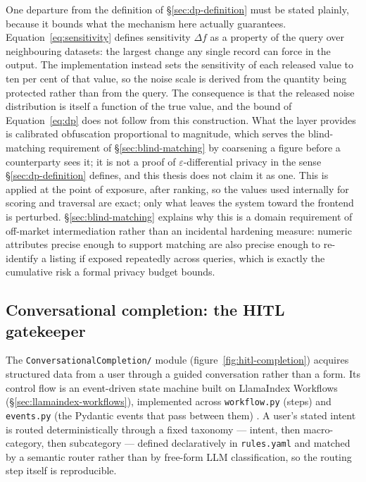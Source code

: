 One departure from the definition of \S\ref{sec:dp-definition} must be stated plainly, because it bounds what the mechanism here actually guarantees. Equation~\ref{eq:sensitivity} defines sensitivity $\Delta f$ as a property of the query over neighbouring datasets: the largest change any single record can force in the output. The implementation instead sets the sensitivity of each released value to ten per cent of that value, so the noise scale is derived from the quantity being protected rather than from the query. The consequence is that the released noise distribution is itself a function of the true value, and the bound of Equation~\ref{eq:dp} does not follow from this construction. What the layer provides is calibrated obfuscation proportional to magnitude, which serves the blind-matching requirement of \S\ref{sec:blind-matching} by coarsening a figure before a counterparty sees it; it is not a proof of $\varepsilon$-differential privacy in the sense \S\ref{sec:dp-definition} defines, and this thesis does not claim it as one. This is applied at the point of exposure, after ranking, so the values used internally for scoring and traversal are exact; only what leaves the system toward the frontend is perturbed. \S\ref{sec:blind-matching} explains why this is a domain requirement of off-market intermediation rather than an incidental hardening measure: numeric attributes precise enough to support matching are also precise enough to re-identify a listing if exposed repeatedly across queries, which is exactly the cumulative risk a formal privacy budget bounds.

\subsection{Conversational completion: the HITL gatekeeper}
\label{sec:coldrag-hitl}

The \texttt{ConversationalCompletion/} module (figure~\ref{fig:hitl-completion}) acquires structured data from a user through a guided conversation rather than a form. Its control flow is an event-driven state machine built on LlamaIndex Workflows (\S\ref{sec:llamaindex-workflows}), implemented across \texttt{workflow.py} (steps) and \texttt{events.py} (the Pydantic events that pass between them) \citep{liu2026llamaindex}. A user's stated intent is routed deterministically through a fixed taxonomy — intent, then macro-category, then subcategory — defined declaratively in \texttt{rules.yaml} and matched by a semantic router rather than by free-form LLM classification, so the routing step itself is reproducible.

